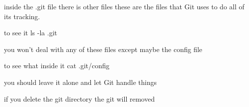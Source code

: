 inside the .git file there is other files 
these are the files that Git uses to do all of its tracking.

to see it  
  ls -la .git 

you won't deal with any of these files except maybe the config file 

to see what inside it 
  cat .git/config

you should leave it alone and let Git handle things

if you delete the git directory the git will removed 